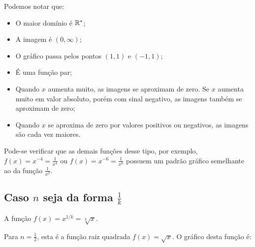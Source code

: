     Podemos notar que:
    \begin{itemize}
        \item O maior domínio é $\mathbb{R}^{*}$;
        \item A imagem é $(0,\infty)$;
        \item O gráfico passa pelos pontos $(1,1)$ e $(-1,1)$;
        \item É uma função par;
        \item Quando $x$ aumenta muito, as imagens se aproximam de zero. Se $x$ aumenta muito em valor absoluto, porém com sinal negativo, as imagens também se aproximam de zero;
        \item Quando $x$ se aproxima de zero por valores positivos ou negativos, as imagens são cada vez maiores.
    \end{itemize}
    
    Pode-se verificar que as demais funções desse tipo, por exemplo, $f(x)=x^{-4}=\frac{1}{x^4}$ ou $f(x)=x^{-6}=\frac{1}{x^6}$ possuem um padrão gráfico semelhante ao da função $\frac{1}{x^2}$.


    \subsection{Caso $n$ seja da forma $\frac{1}{k}$}

    A função $f(x)=x^{1/k}=\sqrt[k]{x}$.

    Para $n=\frac{1}{2}$, esta é a função raiz quadrada $f(x)=\sqrt{x}$. O gráfico desta função é:
\begin{center}
\end{center}

